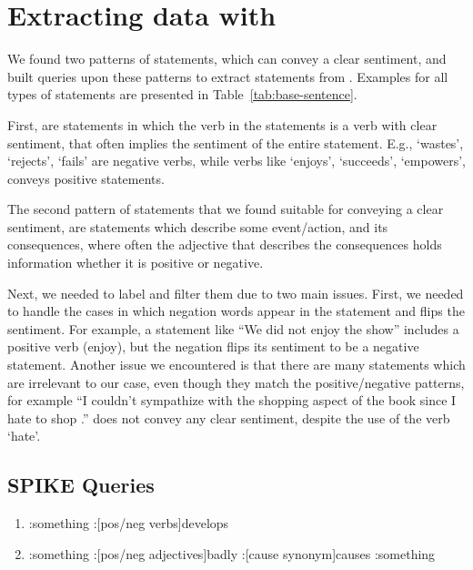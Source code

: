 


\section{Extracting data with \spike}\label{sec:appendix-spike}

We found two patterns of statements, which can convey a clear sentiment, and built queries upon these patterns to extract statements from \spike. Examples for all types of statements are presented in Table~\ref{tab:base-sentence}.


First, are statements in which the verb in the statements is a verb with clear sentiment, that often implies the sentiment of the entire statement. E.g., `wastes', `rejects', `fails' are negative verbs, while verbs like `enjoys', `succeeds', `empowers', conveys positive statements. 

The second pattern of statements that we found suitable for conveying a clear sentiment, are statements which describe some event/action, and its consequences, where often the adjective that describes the consequences holds information whether it is positive or negative. 

Next, we needed to label and filter them due to two main issues. First, we needed to handle the cases in which negation words appear in the statement and flips the sentiment. For example, a statement like ``We did not enjoy the show'' includes a positive verb (enjoy), but the negation flips its sentiment to be a negative statement. Another issue we encountered is that there are many statements which are irrelevant to our case, even though they match the positive/negative patterns, for example ``I couldn't sympathize with the shopping aspect of the book since I hate to shop .'' does not convey any clear sentiment, despite the use of the verb `hate'.





\subsection{SPIKE Queries}
\begin{enumerate}
    \item :something :[{pos/neg verbs}]develops
    \item:something :[{pos/neg adjectives}]badly :[{cause synonym}]causes :something
\end{enumerate}

